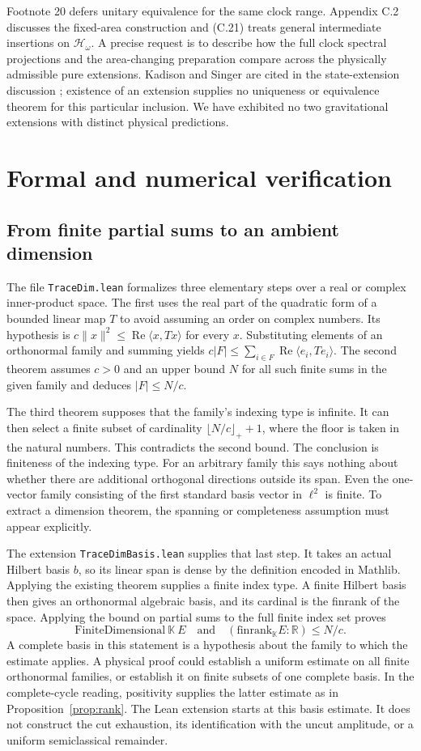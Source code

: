 \documentclass[11pt]{article}
\newcommand{\parttitle}[2]{\section{#1}}
\begin{document}
Footnote 20 defers unitary equivalence for the same clock range. Appendix C.2 discusses the fixed-area construction and (C.21) treats general intermediate insertions on $\mathcal H_\omega$. A precise request is to describe how the full clock spectral projections and the area-changing preparation compare across the physically admissible pure extensions. Kadison and Singer are cited in the state-extension discussion \cite{ks}; existence of an extension supplies no uniqueness or equivalence theorem for this particular inclusion. We have exhibited no two gravitational extensions with distinct physical predictions.

\parttitle{Formal and numerical verification}{Formal and numerical verification}
\subsection{From finite partial sums to an ambient dimension}
The file \texttt{TraceDim.lean} formalizes three elementary steps over a real or complex inner-product space. The first uses the real part of the quadratic form of a bounded linear map $T$ to avoid assuming an order on complex numbers. Its hypothesis is $c\|x\|^2\le\operatorname{Re}\langle x,Tx\rangle$ for every $x$. Substituting elements of an orthonormal family and summing yields $c|F|\le\sum_{i\in F}\operatorname{Re}\langle e_i,Te_i\rangle$. The second theorem assumes $c>0$ and an upper bound $N$ for all such finite sums in the given family and deduces $|F|\le N/c$.

The third theorem supposes that the family's indexing type is infinite. It can then select a finite subset of cardinality $\lfloor N/c\rfloor_++1$, where the floor is taken in the natural numbers. This contradicts the second bound. The conclusion is finiteness of the indexing type. For an arbitrary family this says nothing about whether there are additional orthogonal directions outside its span. Even the one-vector family consisting of the first standard basis vector in $\ell^2$ is finite. To extract a dimension theorem, the spanning or completeness assumption must appear explicitly.

The extension \texttt{TraceDimBasis.lean} supplies that last step. It takes an actual Hilbert basis $b$, so its linear span is dense by the definition encoded in Mathlib. Applying the existing theorem supplies a finite index type. A finite Hilbert basis then gives an orthonormal algebraic basis, and its cardinal is the finrank of the space. Applying the bound on partial sums to the full finite index set proves
\[
 \mathrm{FiniteDimensional}\ \mathbb K\ E
 \quad\text{and}\quad
       (\mathrm{finrank}_{\mathbb K}E:\mathbb R)\le N/c .
\]
A complete basis in this statement is a hypothesis about the family to which the estimate applies. A physical proof could establish a uniform estimate on all finite orthonormal families, or establish it on finite subsets of one complete basis. In the complete-cycle reading, positivity supplies the latter estimate as in Proposition~\ref{prop:rank}. The Lean extension starts at this basis estimate. It does not construct the cut exhaustion, its identification with the uncut amplitude, or a uniform semiclassical remainder.
\end{document}
